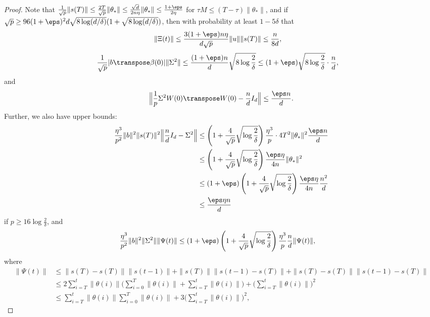 \begin{proof}
    Note that $\frac{1}{\sqrt{p}} \|s(T)\|\leq \frac{2T}{\sqrt{p}} \|\theta_*\| \leq \frac{\sqrt{d}}{2n\eta} \|\theta_*\| \leq \frac{1+\eps}{2\eta}$ for $\tau M \leq (T-\tau) \|\theta_*\|$, and if $\sqrt{p}\geq 96(1+\eps)^2 d\sqrt{8\log(d/\delta)}(1 + \sqrt{8\log(d/\delta)})$, then with probability at least $1-5\delta$ that
    \begin{align*}
        \|\Xi(t)\| & \leq \frac{3(1+\eps)n\eta}{d\sqrt{p}} \|u\|\|s(T)\| \leq \frac{n}{8d},
    \end{align*}
    \begin{align*}
        \frac{1}{\sqrt{p}}|b\transpose\beta(0)| \|\Sigma^2\| & \leq \frac{(1+\eps)n}{d}\sqrt{8\log\frac{2}{\delta}} \leq (1+\eps)\sqrt{8\log\frac{2}{\delta}} \cdot \frac{n}{d},
    \end{align*}
    and
    \begin{align*}
        \Big\| \frac{1}{p}\Sigma^2 W(0)\transpose W(0) - \frac{n}{d} I_d \Big\| \leq \frac{\eps n}{d}.
    \end{align*}
    Further, we also have upper bounds:
    \begin{align*}
        \frac{\eta^3}{p^2} \|b\|^2 \|s(T)\|^2 \Big\| \frac{n}{d}I_d - \Sigma^2 \Big\| & \leq \left(1 + \frac{4}{\sqrt p}\sqrt{\log\frac{2}{\delta}}\right) \frac{\eta^3}{p}\cdot 4T^2 \|\theta_*\|^2 \frac{\eps n}{d} \\
        & \leq \left(1 + \frac{4}{\sqrt p}\sqrt{\log\frac{2}{\delta}}\right) \frac{\eps\eta}{4n} \|\theta_*\|^2 \\
        & \leq (1+\eps) \left(1 + \frac{4}{\sqrt p}\sqrt{\log\frac{2}{\delta}}\right) \frac{\eps\eta}{4n}\frac{n^2}{d} \\
        & \leq \frac{\eps\eta n}{d}
    \end{align*}
    if $p \geq 16\log\frac{2}{\delta}$, and
    \begin{align*}
        \frac{\eta^3}{p^2} \|b\|^2 \|\Sigma^2\| \|\Psi(t)\| & \leq (1+\eps) \left(1 + \frac{4}{\sqrt p}\sqrt{\log\frac{2}{\delta}}\right) \frac{\eta^3}{p} \frac{n}{d} \|\Psi(t)\|,
    \end{align*}
    where 
    \begin{align*}
        \|\Psi(t)\| & \leq \|s(T) - s(T)\| \|s(t-1)\| + \|s(T)\| \|s(t-1) - s(T)\| + \|s(T) - s(T)\|\|s(t-1) - s(T)\| \\
        & \leq 2\sum_{i=T}^t \|\theta(i)\| \Big( \sum_{i=0}^T \|\theta(i)\| + \sum_{i=T}^t \|\theta(i)\| \Big) + \Big( \sum_{i=T}^t \|\theta(i)\| \Big)^2 \\
        & \leq \sum_{i=T}^t \|\theta(i)\| \sum_{i=0}^T \|\theta(i)\| + 3\Big( \sum_{i=T}^t \|\theta(i)\| \Big)^2,

\end{align*}
\end{proof}
